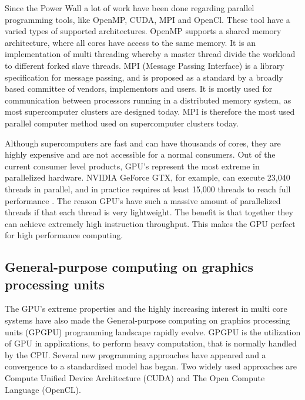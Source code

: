Since the Power Wall a lot of work have been done regarding parallel programming tools, like OpenMP, CUDA, MPI and OpenCl. These tool have a varied types of supported architectures. OpenMP supports a shared memory architecture, where all cores have access to the same memory. It is an implementation of multi threading whereby a master thread divide the workload to different forked slave threads. MPI (Message Passing Interface) is a library specification for message passing, and is proposed as a standard by a broadly based committee of vendors, implementors and users. It is mostly used for communication between processors running in a distributed memory system, as most supercomputer clusters are designed today. MPI is therefore the most used parallel computer method used on supercomputer clusters today.


Although supercomputers are fast and can have thousands of cores, they are highly expensive and are not accessible for a normal consumers. Out of the current consumer level products, GPU's represent the most extreme in parallelized hardware. NVIDIA GeForce GTX, for example, can execute 23,040 threads in parallel, and in practice requires at least 15,000 threads to reach full performance \citep{karras2012}. The reason GPU's have such a massive amount of parallelized threads if that each thread is very lightweight. The benefit is that together they can achieve extremely high instruction throughput. This makes the GPU perfect for high performance computing.


\subsection{General-purpose computing on graphics processing units} %
\label{ssub:general_purpose_computing_on_graphics_processing_units}


The GPU's extreme properties and the highly increasing interest in multi core systems have also made the General-purpose computing on graphics processing units (GPGPU) programming landscape rapidly evolve. GPGPU is the utilization of GPU in applications, to perform heavy computation, that is normally handled by the CPU. Several new programming approaches have appeared and a convergence to a standardized model has began. Two widely used approaches are Compute Unified Device Architecture (CUDA) and The Open Compute Language (OpenCL).


